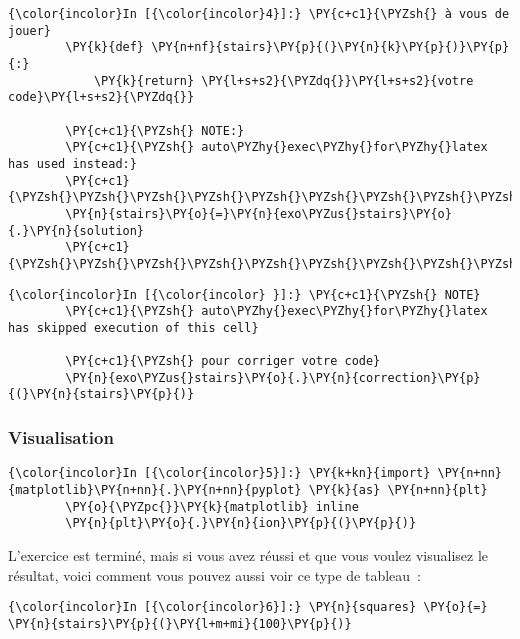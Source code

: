     \begin{Verbatim}[commandchars=\\\{\}]
{\color{incolor}In [{\color{incolor}4}]:} \PY{c+c1}{\PYZsh{} à vous de jouer}
        \PY{k}{def} \PY{n+nf}{stairs}\PY{p}{(}\PY{n}{k}\PY{p}{)}\PY{p}{:}
            \PY{k}{return} \PY{l+s+s2}{\PYZdq{}}\PY{l+s+s2}{votre code}\PY{l+s+s2}{\PYZdq{}}
        
        \PY{c+c1}{\PYZsh{} NOTE:}
        \PY{c+c1}{\PYZsh{} auto\PYZhy{}exec\PYZhy{}for\PYZhy{}latex has used instead:}
        \PY{c+c1}{\PYZsh{}\PYZsh{}\PYZsh{}\PYZsh{}\PYZsh{}\PYZsh{}\PYZsh{}\PYZsh{}\PYZsh{}\PYZsh{}}
        \PY{n}{stairs}\PY{o}{=}\PY{n}{exo\PYZus{}stairs}\PY{o}{.}\PY{n}{solution}
        \PY{c+c1}{\PYZsh{}\PYZsh{}\PYZsh{}\PYZsh{}\PYZsh{}\PYZsh{}\PYZsh{}\PYZsh{}\PYZsh{}\PYZsh{}}
\end{Verbatim}


    \begin{Verbatim}[commandchars=\\\{\}]
{\color{incolor}In [{\color{incolor} }]:} \PY{c+c1}{\PYZsh{} NOTE}
        \PY{c+c1}{\PYZsh{} auto\PYZhy{}exec\PYZhy{}for\PYZhy{}latex has skipped execution of this cell}
        
        \PY{c+c1}{\PYZsh{} pour corriger votre code}
        \PY{n}{exo\PYZus{}stairs}\PY{o}{.}\PY{n}{correction}\PY{p}{(}\PY{n}{stairs}\PY{p}{)}
\end{Verbatim}


    \hypertarget{visualisation}{%
\subsubsection{Visualisation}\label{visualisation}}

    \begin{Verbatim}[commandchars=\\\{\}]
{\color{incolor}In [{\color{incolor}5}]:} \PY{k+kn}{import} \PY{n+nn}{matplotlib}\PY{n+nn}{.}\PY{n+nn}{pyplot} \PY{k}{as} \PY{n+nn}{plt}
        \PY{o}{\PYZpc{}}\PY{k}{matplotlib} inline
        \PY{n}{plt}\PY{o}{.}\PY{n}{ion}\PY{p}{(}\PY{p}{)}
\end{Verbatim}


    L'exercice est terminé, mais si vous avez réussi et que vous voulez
visualisez le résultat, voici comment vous pouvez aussi voir ce type de
tableau~:

    \begin{Verbatim}[commandchars=\\\{\}]
{\color{incolor}In [{\color{incolor}6}]:} \PY{n}{squares} \PY{o}{=} \PY{n}{stairs}\PY{p}{(}\PY{l+m+mi}{100}\PY{p}{)}
\end{Verbatim}


